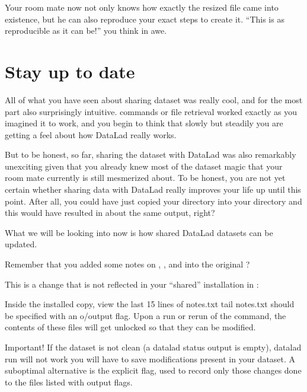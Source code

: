 \sphinxAtStartPar
Your room mate now not only knows how exactly the resized file
came into existence, but he can also reproduce your exact steps to
create it. “This is as reproducible as it can be!” you think in awe.

\sphinxstepscope


\section{Stay up to date}
\label{\detokenize{basics/101-119-sharelocal4:stay-up-to-date}}\label{\detokenize{basics/101-119-sharelocal4:update}}\label{\detokenize{basics/101-119-sharelocal4:sharelocal4}}\label{\detokenize{basics/101-119-sharelocal4::doc}}
\sphinxAtStartPar
All of what you have seen about sharing dataset was really
cool, and for the most part also surprisingly intuitive.
 commands or file retrieval worked exactly as
you imagined it to work, and you begin to think that slowly but
steadily you are getting a feel about how DataLad really works.

\sphinxAtStartPar
But to be honest, so far, sharing the dataset with DataLad was
also remarkably unexciting given that you already knew most of
the dataset magic that your room mate currently is still
mesmerized about.
To be honest, you are not yet certain whether
sharing data with DataLad really improves your life up
until this point. After all, you could have just copied
your directory into your  directory and
this would have resulted in about the same output, right?

\sphinxAtStartPar
What we will be looking into now is how shared DataLad
datasets can be updated.

\sphinxAtStartPar
Remember that you added some notes on ,
, and  into the
original ?

\sphinxAtStartPar
This is a change that is not reflected in your “shared”
installation in :

\begin{sphinxVerbatim}[commandchars=\\\{\}]
\PYGZdl{} \PYGZsh{} Inside the installed copy, view the last 15 lines of notes.txt
\PYGZdl{} tail notes.txt
should be specified with an \PYGZhy{}o/\PYGZhy{}\PYGZhy{}output flag. Upon a run or rerun of
the command, the contents of these files will get unlocked so that
they can be modified.

Important! If the dataset is not \PYGZdq{}clean\PYGZdq{} (a datalad status output is
empty), datalad run will not work \PYGZhy{} you will have to save
modifications present in your dataset.
A suboptimal alternative is the \PYGZhy{}\PYGZhy{}explicit flag, used to record only
those changes done to the files listed with \PYGZhy{}\PYGZhy{}output flags.

\end{sphinxVerbatim}

